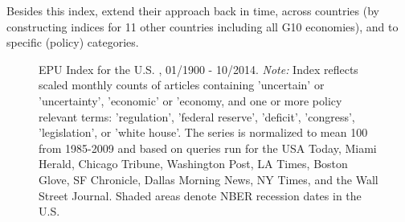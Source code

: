 \documentclass[a4paper,11pt,listof=nochaptergap,oneside,pointednumbers,bibtotoc,bigheadings,liststotoc]{scrbook}
\begin{document}
Besides this index, \citet{bakeretal:15} extend their approach back in time, across countries (by constructing indices for 11 other countries including all G10 economies), and to specific (policy) categories.
 
 \begin{figure}[h]
   \centering
   \setlength\fboxsep{0pt}
   \setlength\fboxrule{0pt}
      \caption[Historical EPU Index for the U.S., 01/1900 - 10/2014.]{EPU Index for the U.S. , 01/1900 - 10/2014.
      \textit{Note:} Index reflects scaled monthly counts of articles containing 'uncertain' or 'uncertainty', 'economic' or 'economy, and one or more policy relevant terms: 'regulation', 'federal reserve', 'deficit', 'congress', 'legislation', or 'white house'. The series is normalized to mean 100 from 1985-2009 and based on queries run for the USA Today, Miami Herald, Chicago Tribune, Washington Post, LA Times, Boston Glove, SF Chronicle, Dallas Morning News, NY Times, and the Wall Street Journal. Shaded areas denote NBER recession dates in the U.S.}   \label{fig:epuindex_historical}
\end{figure}
 
\end{document}

